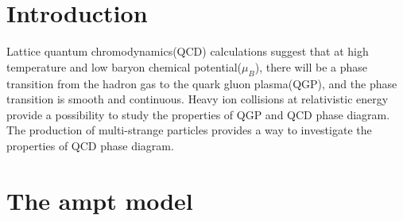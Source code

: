 \documentclass[twocolumn,aps,prc,showpacs,superscriptaddress,preprintnumbers,floatfix,nofootinbib]{revtex4}
\begin{document}
\begin{CJK*}{GBK}{song}
  \section{Introduction}

  Lattice quantum chromodynamics(QCD) calculations suggest that at high temperature and
  low baryon chemical potential($\mu_{B}$), there will be a phase transition from the
  hadron gas to the quark gluon plasma(QGP), and the phase transition is smooth and
  continuous. Heavy ion collisions at relativistic energy provide a possibility to
  study the properties of QGP and QCD phase diagram. The production of multi-strange
  particles provides a way to investigate the properties of QCD phase diagram.


  \section{The ampt model}


\end{CJK*}
\end{document}
